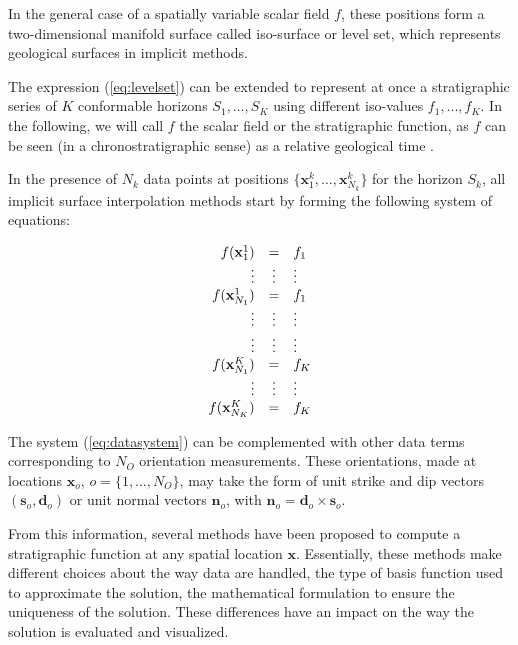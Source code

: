 \documentclass[preprint]{ring20}
\newcommand{\bx}{\mathbf{x}}
\newcommand{\bn}{\mathbf{n}}
\begin{document}
In the general case of a spatially variable scalar field $f$, these positions form a two-dimensional manifold surface called iso-surface or level set, which represents geological surfaces in implicit methods. 

The expression (\ref{eq:levelset}) can be extended to represent 
at once a stratigraphic series of $K$ conformable horizons 
$S_1, \ldots, S_K$ using different iso-values $f_1, \ldots, f_K$. 
In the following, we will call $f$ the scalar field or the stratigraphic function, as $f$ can be seen 
(in a chronostratigraphic sense) as a relative geological time \citep{Mallet2004MG,Lomask2006G,Wu2012G}.

In the presence of $N_k$ data points at positions $\{\mathbf{x}_1^k, \ldots, \mathbf{x}_{N_k}^k\}$ for the horizon $S_k$, all implicit surface interpolation methods start by forming the following system of equations: 

\begin{equation}
\label{eq:datasystem}
\begin{array}{r c l}
f(\bx_1^1) & = & f_1 \\
\vdots & \vdots & \vdots \\
f(\bx_{N_1}^1) & = & f_1 \\
\vdots & \vdots & \vdots \\
\vdots & \vdots & \vdots \\
f(\bx_{N_1}^K) & = & f_K \\
\vdots & \vdots & \vdots \\
f(\bx_{N_K}^K) & = & f_K \\
\end{array}
\end{equation}

The system (\ref{eq:datasystem}) can be complemented with other data terms corresponding to $N_O$ orientation measurements. These orientations, made at locations 
$\bx_o$, $o = \{1, \ldots, N_O\}$, may take the form of unit strike and dip vectors $(\mathbf{s}_o, \mathbf{d}_o)$ or unit normal vectors $\bn_o$, with $\mathbf{n}_o = \mathbf{d}_o \times \mathbf{s}_o$.  
 
From this information, several methods have been proposed to compute a stratigraphic function at any spatial location $\mathbf{x}$. Essentially, these methods make different choices about the way data are handled, the type of basis function used to approximate the solution, the mathematical formulation to ensure the uniqueness of the solution. These differences have an impact on the way the solution is evaluated and visualized. 
 
\end{document}
